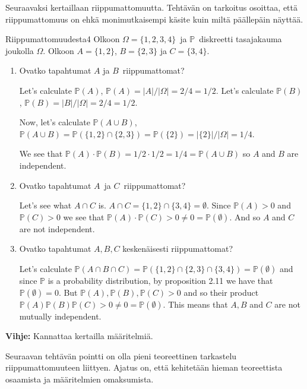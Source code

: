 \documentclass[11pt,a4paper]{amsart}
\newcommand{\1}{\mathbf{1}}
\renewcommand{\P}{\mathbb P}
\begin{document}
Seuraavaksi kertaillaan riippumattomuutta. Tehtävän on tarkoitus osoittaa, että riippumattomuus on ehkä monimutkaisempi käsite kuin miltä päällepäin näyttää.

\begin{Exercises}{Riippumattomuudesta}{4}
Olkoon $\Omega=\{1,2,3,4\}$ ja $\P$ diskreetti tasajakauma joukolla $\Omega$. Olkoon $A=\{1,2\}$, $B=\{2,3\}$ ja $C=\{3,4\}$.
\begin{enumerate}
\item  Ovatko tapahtumat $A$ ja $B$ riippumattomat?

    Let's calculate $ \P(A)$, $ \P(A) = |A| / |\Omega| = 2 /4 = 1 /2$. Let's calculate $ \P(B) $, $
    \P(B) = |B| / |\Omega| = 2/4 = 1/2$. 

    Now, let's calculate $ \P(A \cup B) $, $ \P(A \cup B) = \P( \{ 1,2 \} \cap \{ 2,3 \}) = \P ( \{
    2\}	) = | \{ 2 \}|/ |\Omega| = 1/4 $. 

    We see that $ \P(A) \cdot \P(B) = 1/2 \cdot 1/2 = 1/4 = \P(A \cup B)$ so $ A$ and $ B$ are
    independent. 
\item Ovatko tapahtumat $A$ ja $C$ riippumattomat?

    Let's see what $ A \cap C$ is. $ A \cap C = \{ 1,2 \} \cap \{ 3,4 \} = \emptyset$. Since $ \P(A)
    > 0$ and $ \P(C) >0$ we see that $ \P(A) \cdot \P(C) > 0 \neq 0 = \P(\emptyset)$. And so $ A $
    and $ C$ are not independent. 
\item Ovatko tapahtumat $A,B,C$ keskenäisesti riippumattomat?

    Let's calculate $ \P(A \cap B \cap C) = \P( \{ 1,2 \} \cap \{ 2,3 \} \cap \{ 3,4 \}	) =
    \P( \emptyset)$ and since $ \P$ is a probability distribution, by proposition 2.11 we have that
    $ \P(\emptyset) = 0$. But $ \P(A), \P(B), \P(C) >0$ and so their product $ \P(A) \P(B) \P(C) > 0
    \neq 0 = \P(\emptyset)$. This means that $ A, B $ and $ C$ are not mutually independent.

\end{enumerate}

{\bf Vihje:} Kannattaa kertailla määritelmiä.
\end{Exercises}

Seuraavan tehtävän pointti on olla pieni teoreettinen tarkastelu riippumattomuuteen liittyen. Ajatus on, että kehitetään hieman teoreettista osaamista ja määritelmien omaksumista.
\end{document}
